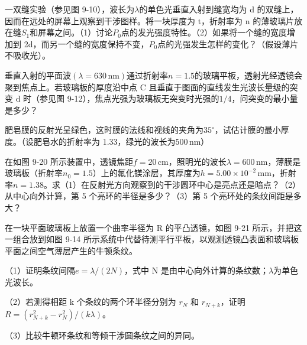 \documentclass[standard, analysis, notocnum]{ExBook}
\newcommand{\answerarea}[1][8cm]{%
  \par\vspace{2mm}%
  \noindent{\color{themeColor!35}\rule{\linewidth}{0.4pt}}\par
  \noindent\begin{minipage}[t][#1][t]{\linewidth}\vspace{0pt}\end{minipage}\par
  \noindent{\color{themeColor!35}\rule{\linewidth}{0.4pt}}\par
}
\begin{document}
\begin{qitems}[startnum=3]
\qitem 一双缝实验（参见图 9-10），波长为$\lambda$的单色光垂直入射到缝宽均为 d 的双缝上，因而在远处的屏幕上观察到干涉图样。将一块厚度为 t，折射率为 n 的薄玻璃片放在缝$S_{1}$和屏幕之间。（1）讨论$P_{0}$点的发光强度特性。（2）如果将一个缝的宽度增加到 2d，而另一个缝的宽度保持不变，$P_{0}$点的光强发生怎样的变化？（假设薄片不吸收光）。
\label{q:209:start}
\answerarea[8cm]
\label{q:209:end}
\end{qitems}

\begin{qitems}[startnum=4]
\qitem 垂直入射的平面波$(\lambda =630\,\mathrm{nm})$通过折射率$n=1.5$的玻璃平板，透射光经透镜会聚到焦点上。若玻璃板的厚度沿中点 C 且垂直于图面的直线发生光波长量级的突变 d 时（参见图 9-12），焦点光强为玻璃板无突变时光强的$1/4$，问突变的最小量是多少？
\label{q:210:start}
\answerarea[8cm]
\label{q:210:end}
\end{qitems}

\begin{qitems}[startnum=5]
\qitem 肥皂膜的反射光呈绿色，这时膜的法线和视线的夹角为$35^{\circ}$，试估计膜的最小厚度。（设肥皂水的折射率为 1.33，绿光的波长为$500\,\mathrm{nm}$）
\label{q:211:start}
\answerarea[8cm]
\label{q:211:end}
\end{qitems}

\begin{qitems}[startnum=6]
\qitem 在如图 9-20 所示装置中，透镜焦距$f=20\,\mathrm{cm}$，照明光的波长$\lambda =600\,\mathrm{nm}$，薄膜是玻璃板（折射率$n_{0}=1.5$）上的氟化镁涂层，其厚度为$h=5.00\times 10^{-2}\,\mathrm{mm}$，折射率$n=1.38$。求（1）在反射光方向观察到的干涉圆环中心是亮点还是暗点？（2）从中心向外计算，第 5 个亮环的半径是多少？（3）第 5 个亮环处的条纹间距是多大？
\label{q:212:start}
\answerarea[8cm]
\label{q:212:end}
\end{qitems}

\begin{qitems}[startnum=7]
\qitem 在一块平面玻璃板上放置一个曲率半径为 R 的平凸透镜，如图 9-21 所示，并把这一组合放到如图 9-14 所示系统中代替待测平行平板，以观测透镜凸表面和玻璃板平面之间空气薄层产生的牛顿条纹。
\par\noindent （1）证明条纹间隔$e=\lambda /(2N)$，式中 N 是由中心向外计算的条纹数；$\lambda$为单色光波长。
\par\noindent （2）若测得相距 k 个条纹的两个环半径分别为 $r_{N}$ 和 $r_{N+k}$，证明$R=(r_{N+k}^{2}-r_{N}^{2})/(k\lambda)$。
\par\noindent （3）比较牛顿环条纹和等倾干涉圆条纹之间的异同。
\label{q:213:start}
\answerarea[8cm]
\label{q:213:end}
\end{qitems}
\end{document}
